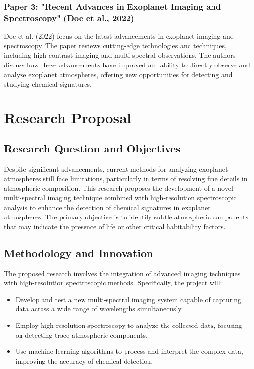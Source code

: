 \documentclass[12pt]{article}
\begin{document}
\subsubsection{Paper 3: "Recent Advances in Exoplanet Imaging and Spectroscopy" (Doe et al., 2022)}
Doe et al. (2022) focus on the latest advancements in exoplanet imaging and spectroscopy. The paper reviews cutting-edge technologies and techniques, including high-contrast imaging and multi-spectral observations. The authors discuss how these advancements have improved our ability to directly observe and analyze exoplanet atmospheres, offering new opportunities for detecting and studying chemical signatures.

\section{Research Proposal}

\subsection{Research Question and Objectives}
Despite significant advancements, current methods for analyzing exoplanet atmospheres still face limitations, particularly in terms of resolving fine details in atmospheric composition. This research proposes the development of a novel multi-spectral imaging technique combined with high-resolution spectroscopic analysis to enhance the detection of chemical signatures in exoplanet atmospheres. The primary objective is to identify subtle atmospheric components that may indicate the presence of life or other critical habitability factors.

\subsection{Methodology and Innovation}
The proposed research involves the integration of advanced imaging techniques with high-resolution spectroscopic methods. Specifically, the project will:
\begin{itemize}
    \item Develop and test a new multi-spectral imaging system capable of capturing data across a wide range of wavelengths simultaneously.
    \item Employ high-resolution spectroscopy to analyze the collected data, focusing on detecting trace atmospheric components.
    \item Use machine learning algorithms to process and interpret the complex data, improving the accuracy of chemical detection.
\end{itemize}
\end{document}
